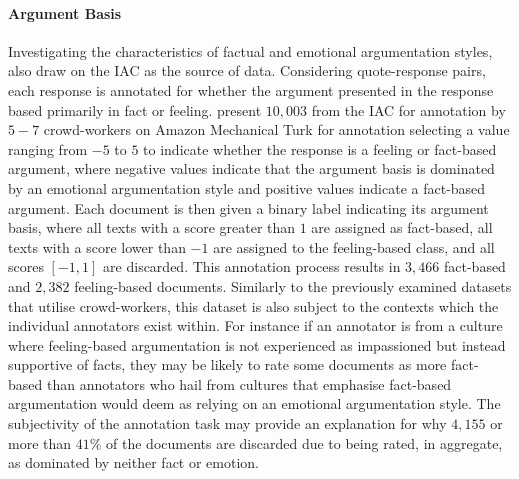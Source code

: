 \paragraph*{Argument Basis} Investigating the characteristics of factual and emotional argumentation styles, \citet{Oraby_fact_feel:2015} also draw on the IAC as the source of data. Considering quote-response pairs, each response is annotated for whether the argument presented in the response based primarily in fact or feeling.
\citet{Oraby_fact_feel:2015} present $10,003$ from the IAC for annotation by $5-7$ crowd-workers on Amazon Mechanical Turk for annotation selecting a value ranging from $-5$ to $5$ to indicate whether the response is a feeling or fact-based argument, where negative values indicate that the argument basis is dominated by an emotional argumentation style and positive values indicate a fact-based argument.
Each document is then given a binary label indicating its argument basis, where all texts with a score greater than $1$ are assigned as fact-based, all texts with a score lower than $-1$ are assigned to the feeling-based class, and all scores $[-1, 1]$ are discarded.
This annotation process results in $3,466$ fact-based and $2,382$ feeling-based documents.
Similarly to the previously examined datasets that utilise crowd-workers, this dataset is also subject to the contexts which the individual annotators exist within. For instance if an annotator is from a culture where feeling-based argumentation is not experienced as impassioned but instead supportive of facts, they may be likely to rate some documents as more fact-based than annotators who hail from cultures that emphasise fact-based argumentation would deem as relying on an emotional argumentation style.
The subjectivity of the annotation task may provide an explanation for why $4,155$ or more than $41\%$ of the documents are discarded due to being rated, in aggregate, as dominated by neither fact or emotion.

